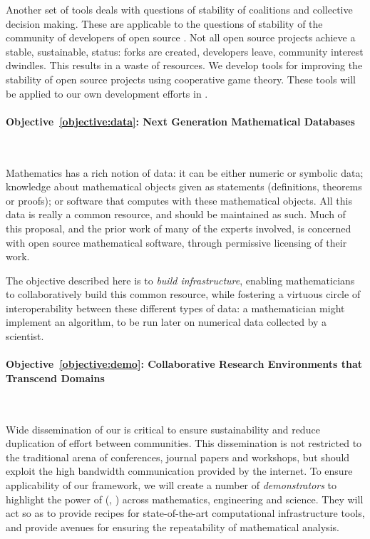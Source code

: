 \documentclass[noworkareas,deliverables,\classoptions]{euproposal}       %
\begin{document}
\begin{proposal}
Another set of tools deals with questions of stability of coalitions
and collective decision making.  These are applicable to the questions
of stability of the community of developers of open source \VREs. Not
all open source projects achieve a stable, sustainable, status: forks
are created, developers leave, community interest dwindles. This
results in a waste of resources.  We develop tools for improving the
stability of open source projects using cooperative game theory. These
tools will be applied to our own development efforts in \TheProject
\VREs.


\paragraph{Objective~\ref{objective:data}: Next Generation Mathematical Databases}\

Mathematics has a rich notion of data: it can be either
numeric or symbolic data; knowledge about mathematical objects given as
statements (definitions, theorems or proofs); or software that computes
with these mathematical objects.
%
All this data is really a common resource, and should be maintained as
such. Much of this proposal, and the prior work of many of the experts
involved, is concerned with open source mathematical software, through
permissive licensing of their work.

The objective described here is to \emph{build infrastructure},
enabling mathematicians to collaboratively build this common resource,
while fostering a virtuous circle of interoperability between these
different types of data: a mathematician might implement an
algorithm, to be run later on numerical data collected by a
scientist.

\paragraph{Objective~\ref{objective:demo}: Collaborative Research Environments that Transcend Domains}\

Wide dissemination of our \VREs is critical to ensure sustainability
and reduce duplication of effort between communities. This
dissemination is not restricted to the traditional arena of
conferences, journal papers and workshops, but should exploit the high
bandwidth communication provided by the internet. To ensure
applicability of our framework, we will create a number of
\emph{demonstrators} to highlight the power of \TheProject{}
(, ) across mathematics,
engineering and science. They will act so as to provide recipes for
state-of-the-art computational infrastructure tools, and provide
avenues for ensuring the repeatability of mathematical analysis.


\end{proposal}
\end{document}
